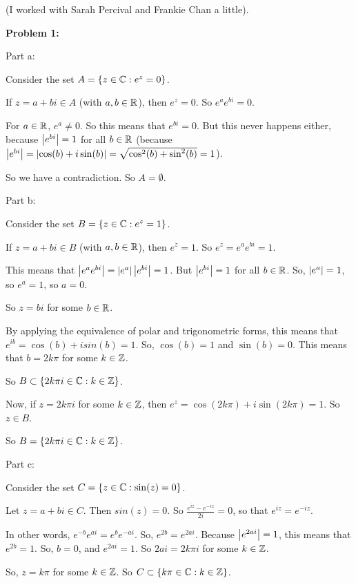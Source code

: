 \documentclass[a4paper,12pt]{article}
\begin{document}
(I worked with Sarah Percival and Frankie Chan a little).

{\bf Problem 1:}

Part a:

Consider the set $A= \{z \in \mathbb{C}: e^z = 0\}$.

If $z=a+bi \in A$ (with $a, b \in \mathbb{R}$), then $e^z =0$. So $e^ae^{bi} = 0$. 

For $a \in \mathbb{R}$, $e^a \neq 0$. So this means that $e^{bi} = 0$. But this never happens either, because $\left\lvert e^{bi} \right\rvert = 1$ for all $b \in \mathbb{R}$ (because $\left\lvert e^{bi} \right\rvert = \left\lvert \cos(b)+i\sin(b) \right\rvert = \sqrt{\cos^2(b) + \sin^2(b)} = 1$).

So we have a contradiction. So $A = \emptyset$.

\shunt

Part b:

Consider the set $B= \{z \in \mathbb{C}: e^z = 1\}$.

If $z=a+bi \in B$ (with $a,b \in \mathbb{R}$), then $e^z = 1$. So $e^z = e^ae^{bi} = 1$.

This means that $\left\lvert e^ae^{bi} \right\rvert = \left\lvert e^a \right\rvert\left\lvert e^{bi} \right\rvert= 1$. But $\left\lvert e^{bi} \right\rvert = 1$ for all $b \in \mathbb{R}$. So, $\left\lvert e^a \right\rvert = 1$, so $e^a = 1$, so $a = 0$.

So $z=bi$ for some $b \in \mathbb{R}$.

By applying the equivalence of polar and trigonometric forms, this means that $e^{ib} = \cos(b) + isin(b) = 1$. So, $\cos(b) =1$ and $\sin(b) = 0$. This means that $b = 2k \pi$ for some $k \in \mathbb{Z}$.

So $B \subset \{2k\pi i \in \mathbb{C}: k \in \mathbb{Z}\}$.

Now, if $z=2k\pi i$ for some $k \in \mathbb{Z}$, then $e^z = \cos(2k \pi ) + i \sin(2k \pi) =1$. So $z \in B$.

So $B = \{2k\pi i \in \mathbb{C}: k \in \mathbb{Z}\}$.

\shunt

Part c:

Consider the set $C= \{z \in \mathbb{C}: \sin(z) = 0\}$.

Let $z =a+bi \in C$. Then $sin(z) = 0$. So $\frac{e^{iz}-e^{-iz}}{2i} = 0$, so that $e^{iz} = e^{-iz}$.

In other words, $e^{-b}e^{ai} = e^{b}e^{-ai}$. So, $e^{2b} = e^{2ai}$. Because  $\left\lvert e^{2ai} \right\rvert = 1$, this means that $e^{2b} = 1$. So, $b=0$, and $e^{2ai}=1$. So $2ai = 2k\pi i $ for some $k \in \mathbb{Z}$.

So, $z=k \pi$ for some $k \in \mathbb{Z}$. So $C \subset \{k\pi  \in \mathbb{C}: k \in \mathbb{Z}\}$.
\end{document}
